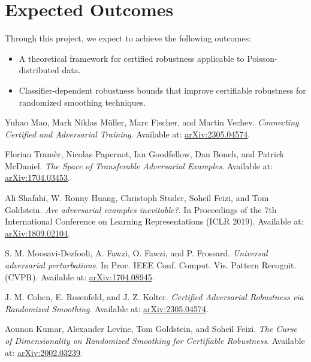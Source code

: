 \documentclass{article}
\begin{document}
\section*{Expected Outcomes} 
Through this project, we expect to achieve the following outcomes: 
\begin{itemize} 
    \item A theoretical framework for certified robustness applicable to Poisson-distributed data.     
    \item Classifier-dependent robustness bounds that improve certifiable robustness for randomized smoothing techniques.
\end{itemize}


\begin{thebibliography}{99}

\label{ref1}
Yuhao Mao, Mark Niklas Müller, Marc Fischer, and Martin Vechev.
\textit{Connecting Certified and Adversarial Training}.
Available at: \href{https://arxiv.org/abs/2305.04574}{arXiv:2305.04574}.

\label{ref2}
Florian Tramèr, Nicolas Papernot, Ian Goodfellow, Dan Boneh, and Patrick McDaniel.
\textit{The Space of Transferable Adversarial Examples}.
Available at: \href{https://arxiv.org/abs/1704.03453}{arXiv:1704.03453}.

\label{ref3}
Ali Shafahi, W. Ronny Huang, Christoph Studer, Soheil Feizi, and Tom Goldstein.
\textit{Are adversarial examples inevitable?}.
In Proceedings of the 7th International Conference on Learning Representations (ICLR 2019).
Available at: \href{https://arxiv.org/abs/1809.02104}{arXiv:1809.02104}.

\label{ref4}
S. M. Moosavi-Dezfooli, A. Fawzi, O. Fawzi, and P. Frossard.
\textit{Universal adversarial perturbations}.
In Proc. IEEE Conf. Comput. Vis. Pattern Recognit. (CVPR).
Available at: \href{https://arxiv.org/abs/1704.08945}{arXiv:1704.08945}.

\label{ref5}
J. M. Cohen, E. Rosenfeld, and J. Z. Kolter.
\textit{Certified Adversarial Robustness via Randomized Smoothing}.
Available at: \href{https://arxiv.org/abs/2305.04574}{arXiv:2305.04574}.

\label{ref6}
Aounon Kumar, Alexander Levine, Tom Goldstein, and Soheil Feizi.
\textit{The Curse of Dimensionality on Randomized Smoothing for Certifiable Robustness}.
Available at: \href{https://arxiv.org/abs/2002.03239}{arXiv:2002.03239}.

\end{thebibliography}
\end{document}
